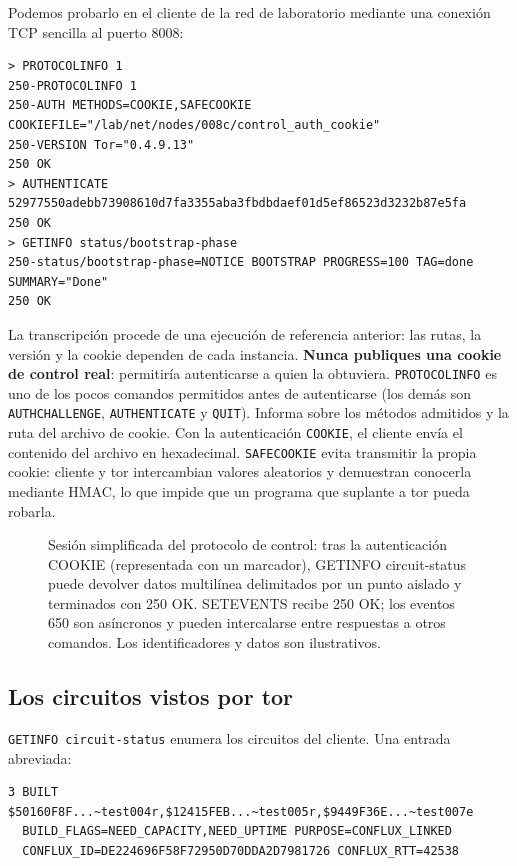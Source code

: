 Podemos probarlo en el cliente de la red de laboratorio mediante una conexión TCP sencilla al puerto 8008:
\begin{lstlisting}[numbers=none]
> PROTOCOLINFO 1
250-PROTOCOLINFO 1
250-AUTH METHODS=COOKIE,SAFECOOKIE COOKIEFILE="/lab/net/nodes/008c/control_auth_cookie"
250-VERSION Tor="0.4.9.13"
250 OK
> AUTHENTICATE 52977550adebb73908610d7fa3355aba3fbdbdaef01d5ef86523d3232b87e5fa
250 OK
> GETINFO status/bootstrap-phase
250-status/bootstrap-phase=NOTICE BOOTSTRAP PROGRESS=100 TAG=done SUMMARY="Done"
250 OK
\end{lstlisting}

La transcripción procede de una ejecución de referencia anterior: las rutas, la versión y la cookie dependen de cada instancia. \textbf{Nunca publiques una cookie de control real}: permitiría autenticarse a quien la obtuviera.
\texttt{PROTOCOLINFO} es uno de los pocos comandos permitidos antes de autenticarse (los demás son \texttt{AUTHCHALLENGE}, \texttt{AUTHENTICATE} y \texttt{QUIT}). Informa sobre los métodos admitidos y la ruta del archivo de cookie. Con la autenticación \texttt{COOKIE}, el cliente envía el contenido del archivo en hexadecimal. \texttt{SAFECOOKIE} evita transmitir la propia cookie: cliente y tor intercambian valores aleatorios y demuestran conocerla mediante HMAC, lo que impide que un programa que suplante a tor pueda robarla.

\begin{figure}[htbp]
\centering

\caption{Sesión simplificada del protocolo de control: tras la autenticación COOKIE (representada con un marcador), GETINFO circuit-status puede devolver datos multilínea delimitados por un punto aislado y terminados con 250 OK. SETEVENTS recibe 250 OK; los eventos 650 son asíncronos y pueden intercalarse entre respuestas a otros comandos. Los identificadores y datos son ilustrativos.}
\label{fig:controllo}
\end{figure}

\subsection{Los circuitos vistos por tor}

\texttt{GETINFO circuit-status} enumera los circuitos del cliente. Una entrada abreviada:
\begin{lstlisting}[numbers=none]
3 BUILT $50160F8F...~test004r,$12415FEB...~test005r,$9449F36E...~test007e
  BUILD_FLAGS=NEED_CAPACITY,NEED_UPTIME PURPOSE=CONFLUX_LINKED
  CONFLUX_ID=DE224696F58F72950D70DDA2D7981726 CONFLUX_RTT=42538
\end{lstlisting}

